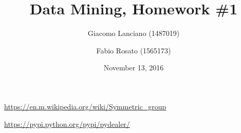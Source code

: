 \documentclass{article}
\title{Data Mining, Homework \#1}
\author{Giacomo Lanciano (1487019) \and Fabio Rosato (1565173)}
\date{November 13, 2016}
\begin{document}
\maketitle
\tableofcontents

\newpage


\newpage


\newpage


\newpage


\newpage
\begin{thebibliography}{9}
	
	\url{https://en.m.wikipedia.org/wiki/Symmetric_group}
	
	\url{https://pypi.python.org/pypi/pydealer/}
	
\end{thebibliography}
\end{document}
